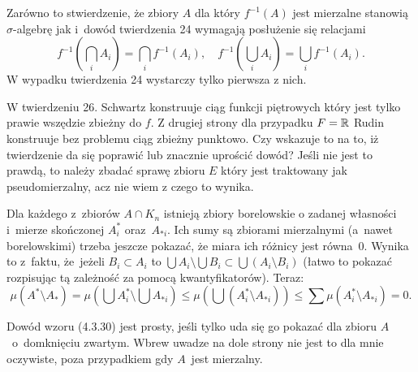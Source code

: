 \documentclass[a4paper,11pt]{article}
\begin{document}
\vspace{\spaceFour}


\start {} Zarówno to stwierdzenie, że zbiory $A$ dla który
$f^{ -1 }( A )$ jest mierzalne stanowią $\sigma$-algebrę jak i~dowód
twierdzenia 24 wymagają posłużenie się relacjami
\begin{equation}
  \label{eq:SchwartzKAMVolI-05}
  f^{ -1 }( \bigcap_{ i } A_{ i } ) = \bigcap_{ i } f^{ -1 }( A_{ i } ), \quad
  f^{ -1 }( \bigcup_{ i } A_{ i } ) = \bigcup_{ i } f^{ -1 }( A_{ i } ).
\end{equation}
W wypadku twierdzenia 24 wystarczy tylko pierwsza z nich.

\vspace{\spaceFour}


\start {} W twierdzeniu 26. Schwartz konstruuje ciąg funkcji
piętrowych który jest tylko prawie wszędzie zbieżny do $f$. Z drugiej
strony dla przypadku $F = \mathbb{R}$ Rudin
\cite{RudinAnalizaRzeczywistaIZespolona1998} konstruuje bez problemu
ciąg zbieżny punktowo. Czy wskazuje to na to, iż twierdzenie da się
poprawić lub znacznie uprościć dowód? Jeśli nie jest to prawdą, to
należy zbadać sprawę zbioru $E$ który jest traktowany jak
pseudomierzalny, acz nie wiem z czego to wynika.

\vspace{\spaceFour}


\start {} Dla każdego z~zbiorów $A \cap K_{ n }$ istnieją
zbiory borelowskie o zadanej własności i~mierze skończonej
$A_{ i }^{ * }$ oraz~$A_{ * i }$. Ich sumy są zbiorami mierzalnymi
(a~nawet borelowskimi) trzeba jeszcze pokazać, że miara ich różnicy
jest równa~0. Wynika to z~faktu, że~jeżeli $B_{ i } \subset A_{ i }$
to
$\bigcup A_{ i } \setminus \bigcup B_{ i } \subset \bigcup ( A_{ i }
\setminus B_{ i } )$ (łatwo to pokazać rozpisując tą zależność za
pomocą kwantyfikatorów). Teraz:
\begin{equation}
  \label{eq:SchwartzKAMVolI-06}
  \mu( A^{ * } \setminus A_{ * } ) = \mu\left( \bigcup A^{ * }_{ i }
    \setminus \bigcup A_{ * i } \right) \leq \mu\left( \bigcup
    ( A^{ * }_{ i } \setminus A_{ * i } ) \right) \leq
  \sum \mu( A^{ * }_{ i } \setminus A_{ * i } ) = 0.
\end{equation}

\vspace{\spaceFour}


\start {} Dowód wzoru (4.3.30) jest prosty, jeśli tylko uda się
go pokazać dla zbioru $A$~o~domknięciu zwartym. Wbrew uwadze na dole
strony nie jest to dla mnie oczywiste, poza przypadkiem gdy $A$~jest
mierzalny.
\end{document}
